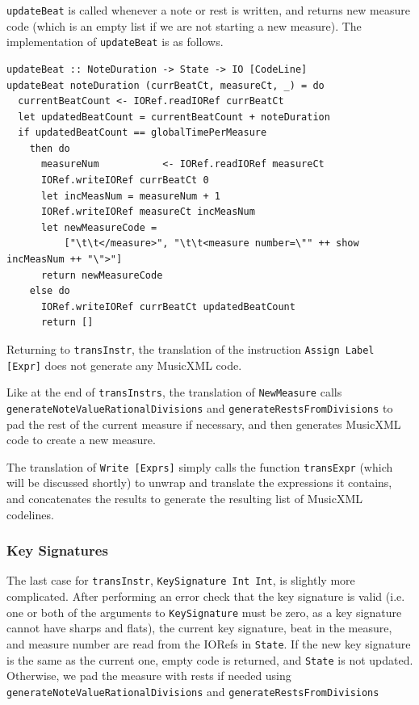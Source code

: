\documentclass{report}
\begin{document}
\verb.updateBeat. is called whenever a note or rest is written, and returns new measure code (which is an empty list if we are not starting a new measure). The implementation of \verb.updateBeat. is as follows.

\begin{verbatim}
updateBeat :: NoteDuration -> State -> IO [CodeLine]
updateBeat noteDuration (currBeatCt, measureCt, _) = do
  currentBeatCount <- IORef.readIORef currBeatCt
  let updatedBeatCount = currentBeatCount + noteDuration 
  if updatedBeatCount == globalTimePerMeasure 
    then do
      measureNum           <- IORef.readIORef measureCt
      IORef.writeIORef currBeatCt 0   
      let incMeasNum = measureNum + 1
      IORef.writeIORef measureCt incMeasNum 
      let newMeasureCode = 
          ["\t\t</measure>", "\t\t<measure number=\"" ++ show incMeasNum ++ "\">"]
      return newMeasureCode
    else do
      IORef.writeIORef currBeatCt updatedBeatCount
      return []
\end{verbatim}

Returning to \verb.transInstr., the translation of the instruction \verb.Assign Label [Expr]. does not generate any MusicXML code. 

Like at the end of \verb.transInstrs., the translation of \verb.NewMeasure. calls \verb.generateNoteValueRationalDivisions. and \verb.generateRestsFromDivisions. to pad the rest of the current measure if necessary, and then generates MusicXML code to create a new measure. 

The translation of \verb.Write [Exprs]. simply calls the function \verb.transExpr. (which will be discussed shortly) to unwrap and translate the expressions it contains, and concatenates the results to generate the resulting list of MusicXML codelines.

\subsubsection{Key Signatures}

The last case for \verb.transInstr., \verb.KeySignature Int Int., is slightly more complicated. After performing an error check that the key signature is valid (i.e. one or both of the arguments to \verb.KeySignature. must be zero, as a key signature cannot have sharps and flats), the current key signature, beat in the measure, and measure number are read from the IORefs in \verb.State.. If the new key signature is the same as the current one, empty code is returned, and \verb.State. is not updated. Otherwise, we pad the measure with rests if needed using \verb.generateNoteValueRationalDivisions. and \verb.generateRestsFromDivisions. 
\end{document}
